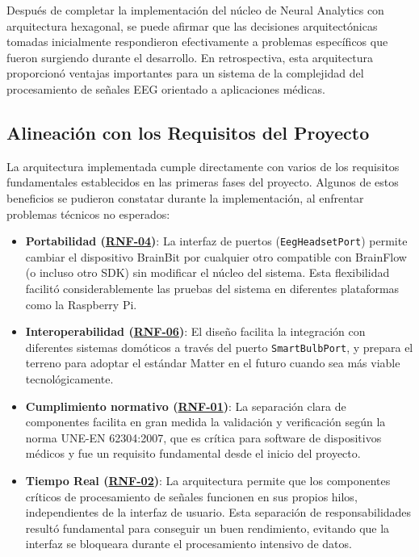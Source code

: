\begin{enumerate}
Después de completar la implementación del núcleo de Neural Analytics con arquitectura hexagonal, se puede afirmar que las decisiones arquitectónicas tomadas inicialmente respondieron efectivamente a problemas específicos que fueron surgiendo durante el desarrollo. En retrospectiva, esta arquitectura proporcionó ventajas importantes para un sistema de la complejidad del procesamiento de señales EEG orientado a aplicaciones médicas.

\subsection{Alineación con los Requisitos del Proyecto}

La arquitectura implementada cumple directamente con varios de los requisitos fundamentales establecidos en las primeras fases del proyecto. Algunos de estos beneficios se pudieron constatar durante la implementación, al enfrentar problemas técnicos no esperados:

\begin{itemize}
    \item \textbf{Portabilidad (\hyperref[rnf-04]{RNF-04})}: La interfaz de puertos (\texttt{EegHeadsetPort}) permite cambiar el dispositivo BrainBit por cualquier otro compatible con BrainFlow (o incluso otro SDK) sin modificar el núcleo del sistema. Esta flexibilidad facilitó considerablemente las pruebas del sistema en diferentes plataformas como la Raspberry Pi.
    
    \item \textbf{Interoperabilidad (\hyperref[rnf-06]{RNF-06})}: El diseño facilita la integración con diferentes sistemas domóticos a través del puerto \texttt{SmartBulbPort}, y prepara el terreno para adoptar el estándar Matter en el futuro cuando sea más viable tecnológicamente.
    
    \item \textbf{Cumplimiento normativo (\hyperref[rnf-01]{RNF-01})}: La separación clara de componentes facilita en gran medida la validación y verificación según la norma UNE-EN 62304:2007, que es crítica para software de dispositivos médicos y fue un requisito fundamental desde el inicio del proyecto.
    
    \item \textbf{Tiempo Real (\hyperref[rnf-02]{RNF-02})}: La arquitectura permite que los componentes críticos de procesamiento de señales funcionen en sus propios hilos, independientes de la interfaz de usuario. Esta separación de responsabilidades resultó fundamental para conseguir un buen rendimiento, evitando que la interfaz se bloqueara durante el procesamiento intensivo de datos.
\end{itemize}


\end{enumerate}

